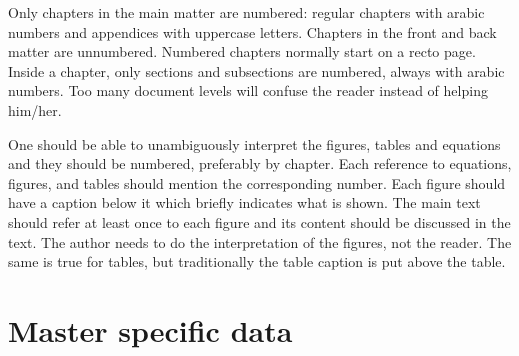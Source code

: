 \documentclass[11pt,article,oneside,a4paper]{memoir}
\begin{document}
Only chapters in the main matter are numbered: regular chapters with arabic
numbers and appendices with uppercase letters. Chapters in the front and
back matter are unnumbered.
Numbered chapters normally start on a recto page.
Inside a chapter, only sections and subsections are numbered, always with
arabic numbers. Too many document levels will confuse the reader instead of
helping him/her.

One should be able to unambiguously interpret the figures, tables and
equations and they should be numbered, preferably by chapter. Each
reference to equations, figures, and tables should mention the
corresponding number. Each figure should have a caption below it which
briefly indicates what is shown. The main text should refer at least once
to each figure and its content should be discussed in the text. The author
needs to do the interpretation of the figures, not the reader. The same is
true for tables, but traditionally the table caption is put above the table.

\chapter{Master specific data}
\begingroup
\makeatletter
\let\kulemt@end@master@def\endinput
\def\ProvidesFile#1[#2]{This section describes some master specific
  data as it was known on \printdateTeX{#2}.\par}
\let\kulemt@div@master\@gobble
\let\kulemt@def@master\@gobbletwo
\newcommand*\kulemt@obsolete@master[3][]{}

\endgroup
\end{document}
